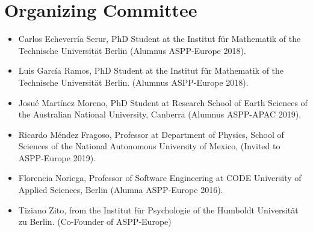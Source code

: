 \documentclass{article}[11pt]
\begin{document}

\section*{Organizing Committee}
\begin{itemize}
    \item Carlos Echeverr\'ia Serur, PhD Student at the Institut f\"ur Mathematik of the Technische Universit\"at Berlin (Alumnus ASPP-Europe 2018).

    \item Luis Garc\'ia Ramos, PhD Student at the Institut f\"ur Mathematik of the Technische Universit\"at Berlin. (Alumnus ASPP-Europe 2018).
    
    \item Josu\'e Mart\'inez Moreno, PhD Student at Research School of Earth Sciences of the Australian National University, Canberra (Alumnus ASPP-APAC 2019).

    \item Ricardo M\'endez Fragoso, Professor at Department of Physics, School of Sciences of the National Autonomous University of Mexico, (Invited to ASPP-Europe 2019).
    
    \item Florencia Noriega, Professor of Software Engineering at CODE University of Applied Sciences, Berlin (Alumna ASPP-Europe 2016).
  
    \item Tiziano Zito, from the Institut f\"ur Psychologie of the Humboldt Universit\"at zu Berlin. (Co-Founder of ASPP-Europe)

\end{itemize}
\end{document}
